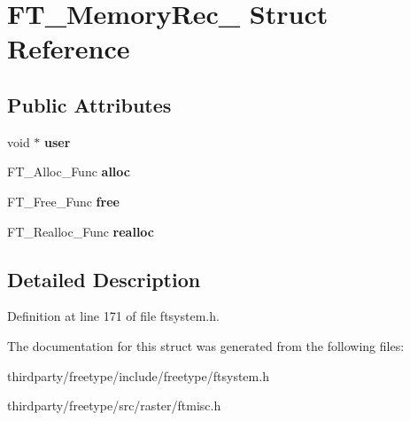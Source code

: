 \hypertarget{struct_f_t___memory_rec__}{}\section{F\+T\+\_\+\+Memory\+Rec\+\_\+ Struct Reference}
\label{struct_f_t___memory_rec__}
\subsection*{Public Attributes}
\begin{DoxyCompactItemize}
\item 
\mbox{\label{struct_f_t___memory_rec___a8fec81d80999f64392ca0b8d0b5bffbf}} 
void $\ast$ {\bfseries user}
\item 
\mbox{\label{struct_f_t___memory_rec___a2269eada6afbb008fe5c73707145410c}} 
F\+T\+\_\+\+Alloc\+\_\+\+Func {\bfseries alloc}
\item 
\mbox{\label{struct_f_t___memory_rec___a83ab2422bd9265d8731b9e5e368ba240}} 
F\+T\+\_\+\+Free\+\_\+\+Func {\bfseries free}
\item 
\mbox{\label{struct_f_t___memory_rec___a5ce3424cc72e898fe973ffeabe44a95c}} 
F\+T\+\_\+\+Realloc\+\_\+\+Func {\bfseries realloc}
\end{DoxyCompactItemize}


\subsection{Detailed Description}


Definition at line 171 of file ftsystem.\+h.



The documentation for this struct was generated from the following files\+:\begin{DoxyCompactItemize}
\item 
thirdparty/freetype/include/freetype/ftsystem.\+h\item 
thirdparty/freetype/src/raster/ftmisc.\+h\end{DoxyCompactItemize}
